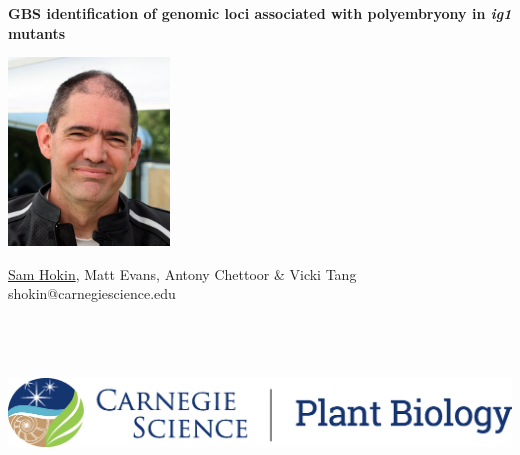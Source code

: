 \documentclass[maize,portrait]{a0poster}
\begin{document}


\textbf{\color{CarnegiePriBlue} \Huge GBS identification of genomic loci associated with polyembryony in \textit{ig1} mutants}    %

\begin{minipage}[m]{0.06\linewidth}
  \includegraphics[height=50mm]{sam-bfr-smiling-crop.jpg} %
  \hfill
\end{minipage}
\begin{minipage}[m]{0.46\linewidth}                      %
  \raggedright
  \color{Black}
  \Large \underline{Sam Hokin}, Matt Evans, Antony Chettoor \& Vicki Tang \\
  \vspace{5mm} 
  \large shokin@carnegiescience.edu
\end{minipage}
\hfill
\begin{minipage}[m]{0.48\linewidth}                      %
  \hfill
  \includegraphics[height=50mm]{CS_plantbio_logo_horz.eps} 
\end{minipage}
\end{document}
